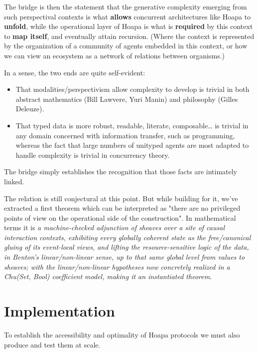 \documentclass[11pt]{article}
\begin{document}
The bridge is then the statement that the generative complexity emerging from such perspectival contexts is what \textbf{allows} concurrent architectures like Hoapa to \textbf{unfold}, while the operational layer of Hoapa is what is \textbf{required} by this context to \textbf{map itself}, and eventually attain recursion. (Where the context is represented by the organization of a community of agents embedded in this context, or how we can view an ecosystem as a network of relations between organisms.)

In a sense, the two ends are quite self-evident:

\begin{itemize}

\item That modalities/perspectivism allow complexity to develop is trivial in both abstract mathematics (Bill Lawvere, Yuri Manin) and philosophy (Gilles Deleuze).

\item That typed data is more robust, readable, literate, composable\ldots{} is trivial in any domain concerned with information transfer, such as programming, whereas the fact that large numbers of unityped agents are most adapted to handle complexity is trivial in concurrency theory.

\end{itemize}

The bridge simply establishes the recognition that those facts are intimately linked.

The relation is still conjectural at this point. But while building for it, we've extracted a first theorem which can be interpreted as "there are no privileged points of view on the operational side of the construction". In mathematical terms it is \emph{a machine-checked adjunction of sheaves over a site of causal interaction contexts, exhibiting every globally coherent state as the free/canonical gluing of its event-local views, and lifting the resource-sensitive logic of the data, in Benton's linear/non-linear sense, up to that same global level from values to sheaves; with the linear/non-linear hypotheses now concretely realized in a Chu(Set, Bool) coefficient model, making it an instantiated theorem}.

\section{Implementation}

To establish the accessibility and optimality of Hoapa protocols we must also produce and test them at scale.
\end{document}

